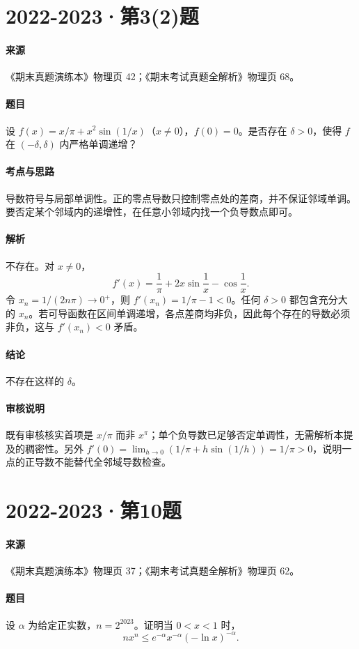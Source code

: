 \documentclass[UTF8,fontset=fandol,12pt,oneside,openany]{ctexrep}
\theoremstyle{definition}
\begin{document}
\par\addvspace{18pt}\noindent\begin{minipage}{\linewidth}
\section{2022-2023·第3(2)题}
\paragraph{来源}《期末真题演练本》物理页 42；《期末考试真题全解析》物理页 68。
\paragraph{题目}
设 $f(x)=x/\pi+x^2\sin(1/x)$（$x\ne0$），$f(0)=0$。是否存在 $\delta>0$，使得 $f$ 在 $(-\delta,\delta)$ 内严格单调递增？
\end{minipage}\par
\paragraph{考点与思路}
导数符号与局部单调性。正的零点导数只控制零点处的差商，并不保证邻域单调。要否定某个邻域内的递增性，在任意小邻域内找一个负导数点即可。
\paragraph{解析}
不存在。对 $x\ne0$，
\[f'(x)=\frac1\pi+2x\sin\frac1x-\cos\frac1x.\]
令 $x_n=1/(2n\pi)\to0^+$，则 $f'(x_n)=1/\pi-1<0$。任何 $\delta>0$ 都包含充分大的 $x_n$。若可导函数在区间单调递增，各点差商均非负，因此每个存在的导数必须非负，这与 $f'(x_n)<0$ 矛盾。
\paragraph{结论}
不存在这样的 $\delta$。
\paragraph{审核说明}
既有审核核实首项是 $x/\pi$ 而非 $x^\pi$；单个负导数已足够否定单调性，无需解析本提及的稠密性。另外 $f'(0)=\lim_{h\to0}(1/\pi+h\sin(1/h))=1/\pi>0$，说明一点的正导数不能替代全邻域导数检查。

\par\addvspace{18pt}\noindent\begin{minipage}{\linewidth}
\section{2022-2023·第10题}
\paragraph{来源}《期末真题演练本》物理页 37；《期末考试真题全解析》物理页 62。
\paragraph{题目}
设 $\alpha$ 为给定正实数，$n=2^{2023}$。证明当 $0<x<1$ 时，
\[nx^n\le e^{-\alpha}x^{-\alpha}(-\ln x)^{-\alpha}.\]
\end{minipage}\par
\end{document}
